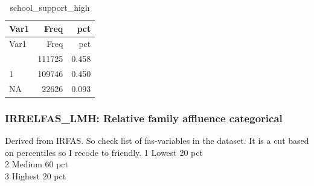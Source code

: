 \documentclass[
]{article}
\newenvironment{Shaded}{\begin{snugshade}}{\end{snugshade}}
\newcommand{\AttributeTok}[1]{\textcolor[rgb]{0.13,0.29,0.53}{#1}}
\newcommand{\ConstantTok}[1]{\textcolor[rgb]{0.56,0.35,0.01}{#1}}
\newcommand{\DecValTok}[1]{\textcolor[rgb]{0.00,0.00,0.81}{#1}}
\newcommand{\FunctionTok}[1]{\textcolor[rgb]{0.13,0.29,0.53}{\textbf{#1}}}
\newcommand{\NormalTok}[1]{#1}
\newcommand{\OtherTok}[1]{\textcolor[rgb]{0.56,0.35,0.01}{#1}}
\newcommand{\SpecialCharTok}[1]{\textcolor[rgb]{0.81,0.36,0.00}{\textbf{#1}}}
\newcommand{\StringTok}[1]{\textcolor[rgb]{0.31,0.60,0.02}{#1}}
\begin{document}
\begin{longtable}[]{@{}lrr@{}}
\caption{school\_support\_high}\tabularnewline
\toprule\noalign{}
Var1 & Freq & pct \\
\midrule\noalign{}
\endfirsthead
\toprule\noalign{}
Var1 & Freq & pct \\
\midrule\noalign{}
\endhead
\bottomrule\noalign{}
\endlastfoot
0 & 111725 & 0.458 \\
1 & 109746 & 0.450 \\
NA & 22626 & 0.093 \\
\end{longtable}

\subsubsection{IRRELFAS\_LMH: Relative family affluence
categorical}\label{irrelfas_lmh-relative-family-affluence-categorical}

Derived from IRFAS. So check list of fas-variables in the dataset. It is
a cut based on percentiles so I recode to friendly. 1 Lowest 20 pct\\
2 Medium 60 pct\\
3 Highest 20 pct

\begin{Shaded}
\end{Shaded}
\end{document}
